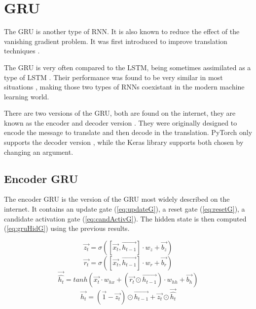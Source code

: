 \section{\acs{GRU}}\label{sec:gru}
The \acf{GRU} is another type of \ac{RNN}. It is also known to reduce the effect of the vanishing gradient problem. It was first introduced to improve translation techniques \cite{gru}.

The \ac{GRU} is very often compared to the \ac{LSTM}, being sometimes assimilated as a type of \ac{LSTM} \cite{nbLSTM}. Their performance was found to be very similar in most situations \cite{gruVSlstm}, making those two types of \acp{RNN} coexistant in the modern machine learning world.

There are two versions of the \ac{GRU}, both are found on the internet, they are known as the encoder and decoder version \cite{gru}. They were originally designed to encode the message to translate and then decode in the translation. PyTorch only supports the decoder version \cite{gruPyTorch}, while the Keras library supports both \cite{gruKeras} chosen by changing an argument.

\subsection{Encoder \ac{GRU}}

The encoder \ac{GRU} is the version of the \ac{GRU} most widely described on the internet. It contains an update gate (\cref{eq:updateG}), a reset gate (\cref{eq:resetG}), a candidate activation gate (\cref{eq:candActivG}). The hidden state is then computed (\cref{eq:gruHidG}) using the previous results.

\begin{equation}\label{eq:updateG}
  \overrightarrow{z_t}=\sigma ([\overrightarrow{x_t},\overrightarrow{h_{t-1}}] \cdot w_z + \overrightarrow{b_z})
\end{equation}
\begin{equation}\label{eq:resetG}
  \overrightarrow{r_t}=\sigma ([\overrightarrow{x_t},\overrightarrow{h_{t-1}}] \cdot w_r + \overrightarrow{b_r})
\end{equation}
\begin{equation}\label{eq:candActivG}
  \overrightarrow{\hat{h_t}}=tanh(\overrightarrow{x_t}\cdot w_{hx}+(\overrightarrow{r_t}\odot\overrightarrow{h_{t-1}}) \cdot w_{hh} + \overrightarrow{b_h})
\end{equation}
\begin{equation}\label{eq:gruHidG}
  \overrightarrow{h_t}=(\overrightarrow{1}-\overrightarrow{z_t})\odot \overrightarrow{h_{t-1}} + \overrightarrow{z_t}\odot \overrightarrow{\hat{h_t}}
\end{equation}

